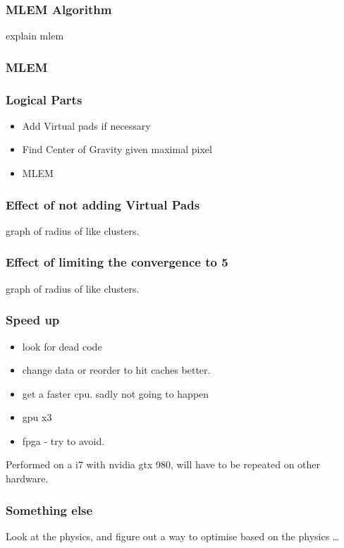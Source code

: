\documentclass{beamer}
\begin{document}
\begin{frame}
  \frametitle{MLEM Algorithm}
explain mlem
\end{frame}

\begin{frame}
  \frametitle{MLEM }

\end{frame}


\begin{frame}
  \frametitle{Logical Parts}
  \begin{itemize}
    \item Add Virtual pads if necessary  
    \item Find Center of Gravity given maximal pixel
    \item MLEM
  \end{itemize}
\end{frame}

\begin{frame}
  \frametitle{Effect of not adding Virtual Pads}
graph of radius of like clusters.
\end{frame}

\begin{frame}
  \frametitle{Effect of limiting the convergence to 5}
graph of radius of like clusters.
\end{frame}

\begin{frame}
  \frametitle{Speed up}
\begin{itemize}
  \item look for dead code
  \item change data or reorder to hit caches better.
  \item get a faster cpu. sadly not going to happen
  \item gpu x3 
  \item fpga - try to avoid.
\end{itemize}
Performed on a i7 with nvidia gtx 980, will have to be repeated on other hardware.
\end{frame}

\begin{frame}
\frametitle{Something else}
Look at the physics, and figure out a way to optimise based on the physics \ldots
\end{frame}
\end{document}
